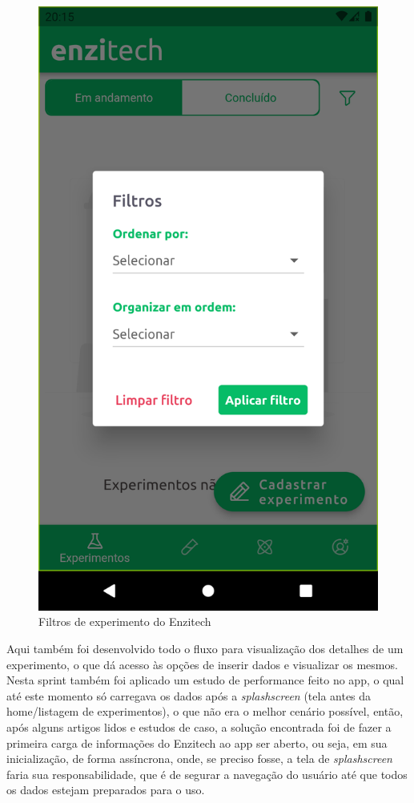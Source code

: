  \begin{figure}[H]
\centering
  \includegraphics[width=\columnwidth/2]{images/filtros_sprint_6.png}
  \caption{Filtros de experimento do Enzitech}
  \label{fig:filtros_sprint_6}
\end{figure}

Aqui também foi desenvolvido todo o fluxo para visualização dos detalhes de um experimento, o que dá acesso às opções de inserir dados e visualizar os mesmos. Nesta sprint também foi aplicado um estudo de performance feito no \ac{app}, o qual até este momento só carregava os dados após a \textit{splashscreen} (tela antes da home/listagem de experimentos), o que não era o melhor cenário possível, então, após alguns artigos lidos e estudos de caso, a solução encontrada foi de fazer a primeira carga de informações do Enzitech ao \ac{app} ser aberto, ou seja, em sua inicialização, de forma assíncrona, onde, se preciso fosse, a tela de \textit{splashscreen} faria sua responsabilidade, que é de segurar a navegação do usuário até que todos os dados estejam preparados para o uso. 

